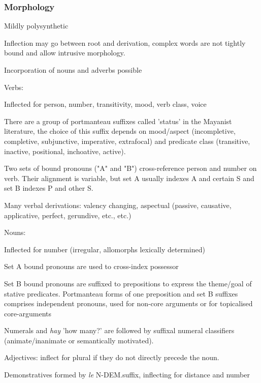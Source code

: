 \documentclass[a4paper, 11pt]{book}
\begin{document}
\subsubsection*{Morphology}

\begin{itemize*}
\item  Mildly polysynthetic
\item  Inflection may go between root and derivation, complex words are not tightly bound and allow intrusive morphology.
\item  Incorporation of nouns and adverbs possible
\item  Verbs:
\begin{itemize*}
	\item  Inflected for person, number, transitivity, mood, verb class, voice
	\item  There are a group of portmanteau suffixes called 'status' in the Mayanist literature, the choice of this suffix depends on mood/aspect (incompletive, completive, subjunctive, imperative, extrafocal) and predicate class (transitive, inactive, positional, inchoative, active).
	\item  Two sets of bound pronouns ("A" and "B") cross-reference person and number on verb. Their alignment is variable, but set A usually indexes A and certain S and set B indexes P and other S. 
	\item  Many verbal derivations: valency changing, aspectual (passive, causative, applicative, perfect, gerundive, etc., etc.)
\end{itemize*}
\item  Nouns:
\begin{itemize*}
	\item  Inflected for number (irregular, allomorphs lexically determined)
	\item  Set A bound pronouns are used to cross-index possessor
	\item  Set B bound pronouns are suffixed to prepositions to express the theme/goal of stative predicates. Portmanteau forms of one preposition and set B suffixes comprises independent pronouns, used for non-core arguments or for topicalised core-arguments
\end{itemize*}
\item  Numerals and \textit{hay} 'how many?' are followed by suffixal numeral classifiers (animate/inanimate or semantically motivated).
\item  Adjectives: inflect for plural if they do not directly precede the noun.
\item  Demonstratives formed by \textit{le} N-DEM.suffix, inflecting for distance and number
\end{itemize*}
\end{document}

